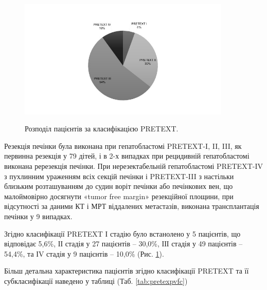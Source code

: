 \begin{figure}[h]
\centering
\includegraphics[width=0.9\textwidth]{Illustrations/pretexpac.jpeg}
\label{fig:pretexpac} %
\caption{Розподіл пацієнтів за класифікацією PRETEXT.}
\end{figure}


Резекція печінки була виконана при гепатобластомі PRETEXT-I, II, III, як первинна резекція у 79 дітей, і в 2-х випадках при рецидивній гепатобластомі виконана ререзекція печінки. При нерезектабельній гепатобластомі PRETEXT-IV з пухлинним ураженням всіх секцій печінки і PRETEXT-III з настільки близьким розташуванням до судин воріт печінки або печінкових вен, що малоймовірно досягнути «tumor free margin» резекційної площини, при відсутності за даними КТ і МРТ віддалених метастазів, виконана трансплантація печінки у 9 випадках.

Згідно класифікації PRETEXT І стадію було встанолено у 5 пацієнтів, що відповідає 5,6\%, ІІ стадія у 27 пацієнтів – 30,0\%, ІІІ стадія у 49 пацієнтів – 54,4\%, та ІV стадія у 9 пацієнтів – 10,0\% (Рис. \ref{fig:pretexpac}).

Більш детальна характеристика пацієнтів згідно класифікації PRETEXT та її субкласифікації наведено у таблиці (Таб. \ref{tab:pretexpvfc})

